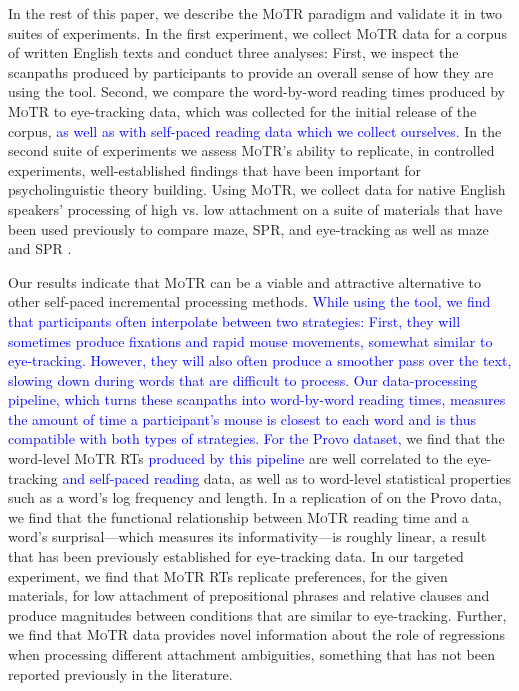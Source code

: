 \documentclass[12pt]{article}
\newcommand{\motr}{\textsc{MoTR}\xspace}
\newcommand{\change}[1]{\textcolor{blue}{#1}}
\begin{document}
In the rest of this paper, we describe the \motr paradigm and validate it in two suites of experiments. In the first experiment, we collect \motr data for a corpus of written English texts \citep[the Provo Corpus;][]{luke2018provo} and conduct three analyses: First, we inspect the scanpaths produced by participants to provide an overall sense of how they are using the tool. Second, we compare the word-by-word reading times produced by \motr to eye-tracking data, which was collected for the initial release of the corpus, \change{as well as with self-paced reading data which we collect ourselves.} In the second suite of experiments we assess \motr’s ability to replicate, in controlled experiments, well-established findings that have been important for psycholinguistic theory building. Using \motr, we collect data for native English speakers' processing of high vs. low attachment on a suite of materials that have been used previously to compare maze, SPR, and eye-tracking \citep{witzel2012maze} as well as maze and SPR \citep{boyce2020amaze}. 

Our results indicate that \motr can be a viable and attractive alternative to other self-paced incremental processing methods. \change{While using the tool, we find that participants often interpolate between two strategies: First, they will sometimes produce fixations and rapid mouse movements, somewhat similar to eye-tracking. However, they will also often produce a smoother pass over the text, slowing down during words that are difficult to process. Our data-processing pipeline, which turns these scanpaths into word-by-word reading times, measures the amount of time a participant's mouse is closest to each word and is thus compatible with both types of strategies.} \change{For the Provo dataset,} we find that the word-level \motr RTs \change{produced by this pipeline} are well correlated to the eye-tracking \change{and self-paced reading} data, as well as to word-level statistical properties such as a word’s log frequency and length. In a replication of \citet{smith2013effect} on the Provo data, we find that the functional relationship between \motr reading time and a word’s surprisal---which measures its informativity---is roughly linear, a result that has been previously established for eye-tracking data. In our targeted experiment, we find that \motr RTs replicate preferences, for the given materials, for low attachment of prepositional phrases and relative clauses and produce magnitudes between conditions that are similar to eye-tracking. Further, we find that \motr data provides novel information about the role of regressions when processing different attachment ambiguities, something that has not been reported previously in the literature. 
\end{document}
